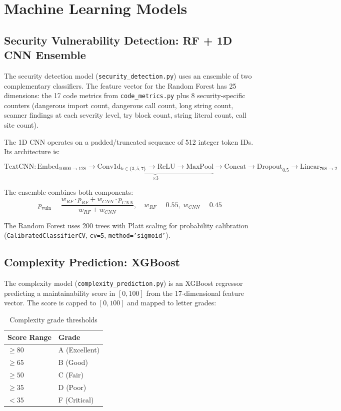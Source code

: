 \documentclass[12pt, oneside]{report}
\begin{document}
\section{Machine Learning Models}
\label{sec:models}

\subsection{Security Vulnerability Detection: RF + 1D CNN Ensemble}
\label{ssec:security}

The security detection model (\texttt{security\_detection.py}) uses an ensemble of two
complementary classifiers. The feature vector for the Random Forest has 25 dimensions:
the 17 code metrics from \texttt{code\_metrics.py} plus 8 security-specific counters
(dangerous import count, dangerous call count, long string count, scanner findings at
each severity level, try block count, string literal count, call site count).

The 1D CNN operates on a padded/truncated sequence of 512 integer token IDs. Its
architecture is:

\begin{equation}
  \text{TextCNN}: \text{Embed}_{10000 \to 128} \to
  \underbrace{\text{Conv1d}_{k \in \{3,5,7\}} \to \text{ReLU} \to \text{MaxPool}}_{\times 3}
  \to \text{Concat} \to \text{Dropout}_{0.5} \to \text{Linear}_{768 \to 2}
\end{equation}

The ensemble combines both components:
\begin{equation}
  p_{\text{vuln}} = \frac{w_{RF} \cdot p_{RF} + w_{CNN} \cdot p_{CNN}}{w_{RF} + w_{CNN}},
  \quad w_{RF} = 0.55,\; w_{CNN} = 0.45
\end{equation}

The Random Forest uses 200 trees with Platt scaling for probability calibration
(\texttt{CalibratedClassifierCV}, \texttt{cv=5}, \texttt{method='sigmoid'}).

\subsection{Complexity Prediction: XGBoost}
\label{ssec:complexity}

The complexity model (\texttt{complexity\_prediction.py}) is an XGBoost regressor
predicting a maintainability score in $[0, 100]$ from the 17-dimensional feature vector.
The score is capped to $[0, 100]$ and mapped to letter grades:

\begin{table}[H]
\centering
\caption{Complexity grade thresholds}
\label{tab:grades}
\begin{tabular}{@{}ll@{}}
\toprule
\textbf{Score Range} & \textbf{Grade} \\
\midrule
$\geq 80$ & A (Excellent) \\
$\geq 65$ & B (Good) \\
$\geq 50$ & C (Fair) \\
$\geq 35$ & D (Poor) \\
$< 35$ & F (Critical) \\
\bottomrule
\end{tabular}
\end{table}
\end{document}
